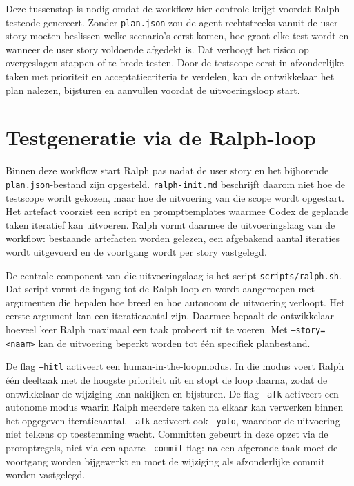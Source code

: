 Deze tussenstap is nodig omdat de workflow hier controle krijgt voordat Ralph testcode genereert. Zonder \texttt{plan.json} zou de agent rechtstreeks vanuit de user story moeten beslissen welke scenario's eerst komen, hoe groot elke test wordt en wanneer de user story voldoende afgedekt is. Dat verhoogt het risico op overgeslagen stappen of te brede testen. Door de testscope eerst in afzonderlijke taken met prioriteit en acceptatiecriteria te verdelen, kan de ontwikkelaar het plan nalezen, bijsturen en aanvullen voordat de uitvoeringsloop start.

\section{Testgeneratie via de Ralph-loop}

Binnen deze workflow start Ralph pas nadat de user story en het bijhorende \texttt{plan.json}-bestand zijn opgesteld. \texttt{ralph-init.md} beschrijft daarom niet hoe de testscope wordt gekozen, maar hoe de uitvoering van die scope wordt opgestart. Het artefact voorziet een script en prompttemplates waarmee Codex de geplande taken iteratief kan uitvoeren. Ralph vormt daarmee de uitvoeringslaag van de workflow: bestaande artefacten worden gelezen, een afgebakend aantal iteraties wordt uitgevoerd en de voortgang wordt per story vastgelegd.

De centrale component van die uitvoeringslaag is het script \texttt{scripts/ralph.sh}. Dat script vormt de ingang tot de Ralph-loop en wordt aangeroepen met argumenten die bepalen hoe breed en hoe autonoom de uitvoering verloopt. Het eerste argument kan een iteratieaantal zijn. Daarmee bepaalt de ontwikkelaar hoeveel keer Ralph maximaal een taak probeert uit te voeren. Met \texttt{--story=<naam>} kan de uitvoering beperkt worden tot één specifiek planbestand.

De flag \texttt{--hitl} activeert een human-in-the-loopmodus. In die modus voert Ralph één deeltaak met de hoogste prioriteit uit en stopt de loop daarna, zodat de ontwikkelaar de wijziging kan nakijken en bijsturen. De flag \texttt{--afk} activeert een autonome modus waarin Ralph meerdere taken na elkaar kan verwerken binnen het opgegeven iteratieaantal. \texttt{--afk} activeert ook \texttt{--yolo}, waardoor de uitvoering niet telkens op toestemming wacht. Committen gebeurt in deze opzet via de promptregels, niet via een aparte \texttt{--commit}-flag: na een afgeronde taak moet de voortgang worden bijgewerkt en moet de wijziging als afzonderlijke commit worden vastgelegd.

